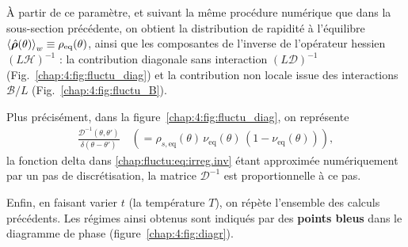 






\medskip

À partir de ce paramètre, et suivant la même procédure numérique que dans la sous-section précédente, on obtient la distribution de rapidité à l'équilibre
\(\braket{\hat{\bm{\rho}}(\theta)}_w \equiv \rho_{\mathrm{eq}}(\theta)\), ainsi que les composantes de l’inverse de l’opérateur hessien \((L\mathcal{H})^{-1}\) : la contribution diagonale sans interaction \((L\mathcal{D})^{-1}\) (Fig.~\ref{chap:4:fig:fluctu_diag}) et la contribution non locale issue des interactions \(\mathcal{B}/L\) (Fig.~\ref{chap:4:fig:fluctu_B}).

\medskip

Plus précisément, dans la figure~\ref{chap:4:fig:fluctu_diag}, on représente
\begin{eqnarray*}
	\frac{\mathcal{D}^{-1}(\theta, \theta')}{\delta(\theta - \theta')} \quad  \left( =  \rho_{s, \mathrm{eq}}(\theta) \, \nu_{\mathrm{eq}}(\theta) \, (1 - \nu_{\mathrm{eq}}(\theta)) \right),
\end{eqnarray*}
la fonction delta dans \eqref{chap:fluctu:eq:irreg.inv} étant approximée numériquement par un pas de discrétisation, la matrice \(\mathcal{D}^{-1}\) est proportionnelle à ce pas.

\medskip

Enfin, en faisant varier $t$ (\ie la température \(T\)), on répète l'ensemble des calculs précédents.
Les régimes ainsi obtenus sont indiqués par des {\bf points bleus} dans le diagramme de phase (figure~\ref{chap:4:fig:diagr}).



